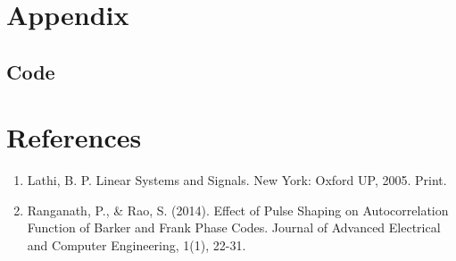 \documentclass{article}
\begin{document}
\section{Appendix}

\subsection{Code}




\section{References}
\begin{enumerate}
\item Lathi, B. P. Linear Systems and Signals. New York: Oxford UP, 2005. Print.

\item Ranganath, P., & Rao, S. (2014). Effect of Pulse Shaping on Autocorrelation Function of Barker and Frank Phase Codes. Journal of Advanced Electrical and Computer Engineering, 1(1), 22-31.
\end{enumerate}
\end{document}
